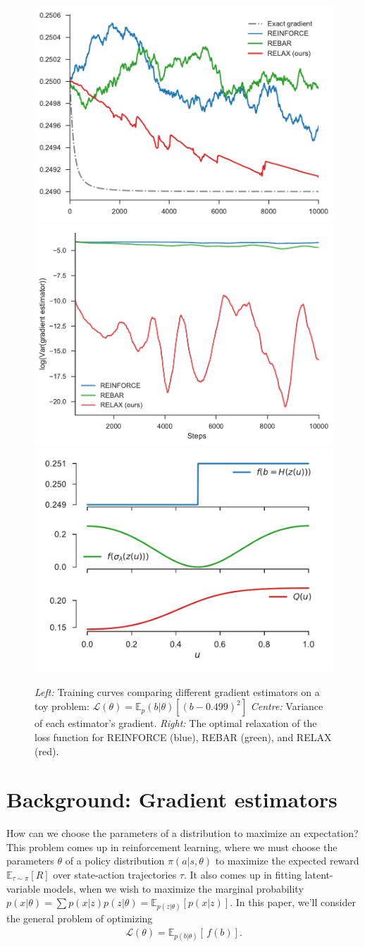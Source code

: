 \documentclass{article}
\newcommand{\discreteDist}{p(b|\theta)}
\newcommand{\loss}{f(b)}
\newcommand{\expectedLoss}{\mathbb{E}_{\discreteDist{}} \! \left[ \, \loss{} \right]}
\newcommand{\E}{\mathbb{E}}
\begin{document}
\begin{figure}[h]
\centering
\includegraphics[width=.325\textwidth]{figures/toy_losses_10000_0_499}
\includegraphics[width=.325\textwidth, clip, trim=3mm 3mm 3mm 3mm]{figures/variance_100_t_499}
\includegraphics[width=.325\textwidth]{figures/relaxations_t499}
\caption{
\emph{Left:} Training curves comparing different gradient estimators on a toy problem: ${\mathcal{L}(\theta) = \E_p(b|\theta) [ (b - 0.499)^2 ]}$
\emph{Centre:} Variance of each estimator's gradient.
\emph{Right:} The optimal relaxation of the loss function for REINFORCE (blue), REBAR (green), and RELAX (red).
}
\label{first figure}
\end{figure}


\section{Background: Gradient estimators}
How can we choose the parameters of a distribution to maximize an expectation?
This problem comes up in reinforcement learning, where we must choose the parameters $\theta$ of a policy distribution $\pi(a|s, \theta)$ to maximize the expected reward $\mathbb{E}_{\tau \sim \pi} \left[ R \right]$ over state-action trajectories $\tau$.
It also comes up in fitting latent-variable models, when we wish to maximize the marginal probability ${p(x|\theta) = \sum p(x|z) p(z|\theta) = \mathbb{E}_{p(z|\theta)} \left[ p(x|z) \right]}$.
In this paper, we'll consider the general problem of optimizing
%
\begin{align}
\mathcal{L}(\theta)=\expectedLoss{}.
\end{align}
%
\end{document}
